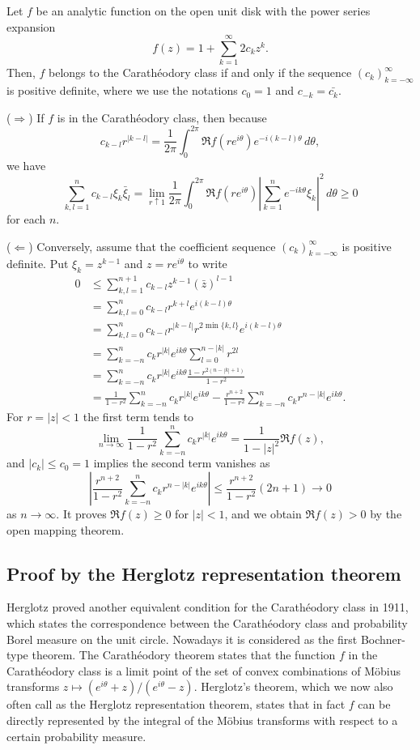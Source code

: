 \documentclass{../../small}
\begin{document}
\begin{thm}
Let $f$ be an analytic function on the open unit disk with the power series expansion
\[f(z)=1+\sum_{k=1}^\infty2c_kz^k.\]
Then, $f$ belongs to the Carath\'eodory class if and only if the sequence $(c_k)_{k=-\infty}^\infty$ is positive definite, where we use the notations $c_0=1$ and $c_{-k}=\bar{c_k}$.
\end{thm}
\begin{pf}
($\Rightarrow$)
If $f$ is in the Carath\'eodory class, then because
\[c_{k-l}r^{|k-l|}=\frac1{2\pi}\int_0^{2\pi}\Re f(re^{i\theta})e^{-i(k-l)\theta}\,d\theta,\]
we have
\[\sum_{k,l=1}^nc_{k-l}\xi_k\bar\xi_l
=\lim_{r\uparrow1}\frac1{2\pi}\int_0^{2\pi}\Re f(re^{i\theta})\left|\sum_{k=1}^ne^{-ik\theta}\xi_k\right|^2\,d\theta\ge0\]
for each $n$.

($\Leftarrow$)
Conversely, assume that the coefficient sequence $(c_k)_{k=-\infty}^\infty$ is positive definite.
Put $\xi_k=z^{k-1}$ and $z=re^{i\theta}$ to write
\begin{align*}
0&\le\sum_{k,l=1}^{n+1}c_{k-l}z^{k-1}(\bar z)^{l-1}\\
&=\sum_{k,l=0}^nc_{k-l}r^{k+l}e^{i(k-l)\theta}\\
&=\sum_{k,l=0}^nc_{k-l}r^{|k-l|}r^{2\min\{k,l\}}e^{i(k-l)\theta}\\
&=\sum_{k=-n}^nc_kr^{|k|}e^{ik\theta}\sum_{l=0}^{n-|k|}r^{2l}\\
&=\sum_{k=-n}^nc_kr^{|k|}e^{ik\theta}\frac{1-r^{2(n-|k|+1)}}{1-r^2}\\
&=\frac1{1-r^2}\sum_{k=-n}^nc_kr^{|k|}e^{ik\theta}
-\frac{r^{n+2}}{1-r^2}\sum_{k=-n}^nc_kr^{n-|k|}e^{ik\theta}.
\end{align*}
For $r=|z|<1$ the first term tends to
\[\lim_{n\to\infty}\frac1{1-r^2}\sum_{k=-n}^nc_kr^{|k|}e^{ik\theta}=\frac1{1-|z|^2}\Re f(z),\]
and $|c_k|\le c_0=1$ implies the second term vanishes as
\[\left|\frac{r^{n+2}}{1-r^2}\sum_{k=-n}^nc_kr^{n-|k|}e^{ik\theta}\right|\le\frac{r^{n+2}}{1-r^2}(2n+1)\to0\]
as $n\to\infty$.
It proves $\Re f(z)\ge0$ for $|z|<1$, and we obtain $\Re f(z)>0$ by the open mapping theorem.
\end{pf}


\subsection{Proof by the Herglotz representation theorem}

Herglotz \cite{herglotz1911uber} proved another equivalent condition for the Carath\'eodory class in 1911, which states the correspondence between the Carath\'eodory class and probability Borel measure on the unit circle.
Nowadays it is considered as the first Bochner-type theorem.
The Carath\'eodory theorem states that the function $f$ in the Carath\'eodory class is a limit point of the set of convex combinations of M\"obius transforms $z\mapsto(e^{i\theta}+z)/(e^{i\theta}-z)$.
Herglotz's theorem, which we now also often call as the Herglotz representation theorem, states that in fact $f$ can be directly represented by the integral of the M\"obius transforms with respect to a certain probability measure.
\end{document}
